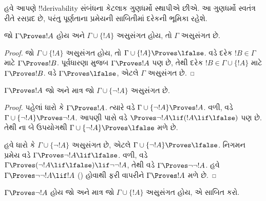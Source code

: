 \documentclass[../../../include/open-logic-section]{subfiles}
\begin{document}
      {}
      {}


હવે આપણે !!{derivability} સંબંધના કેટલાક ગુણધર્મો સ્થાપીએ છીએ. આ
ગુણધર્મો સ્વતંત્ર રીતે રસપ્રદ છે, પરંતુ પૂર્ણતાના પ્રમેયની સાબિતીમાં
દરેકની ભૂમિકા રહેશે.

\begin{prop}
  જો $\Gamma \Proves !A$ હોય અને $\Gamma \cup \{!A\}$ અસુસંગત હોય,
  તો $\Gamma$ અસુસંગત છે.
\end{prop}

\begin{proof}
  જો $\Gamma \cup \{!A\}$ અસુસંગત હોય, તો
  $\Gamma \cup \{!A\} \Proves \lfalse$. 
  વડે દરેક $!B \in \Gamma$ માટે $\Gamma \Proves !B$. પૂર્વધારણા
  મુજબ $\Gamma \Proves !A$ પણ છે, તેથી દરેક
  $!B \in \Gamma \cup \{!A\}$ માટે $\Gamma \Proves !B$.
   વડે $\Gamma \Proves \lfalse$, એટલે
  $\Gamma$ અસુસંગત છે.
\end{proof}

\begin{prop}
$\Gamma \Proves !A$ જો અને માત્ર જો $\Gamma \cup \{\lnot !A\}$
અસુસંગત છે.
\end{prop}

\begin{proof}
પહેલાં ધારો કે $\Gamma \Proves !A$. ત્યારે
 વડે
$\Gamma \cup \{\lnot !A\} \Proves !A$. વળી,
 વડે
$\Gamma \cup \{\lnot !A\} \Proves \lnot !A$. આપણી પાસે
 વડે
$\Proves \lnot !A \lif (!A \lif \lfalse)$ પણ છે. તેથી
ના બે ઉપયોગથી
$\Gamma \cup \{\lnot !A\} \Proves \lfalse$ મળે છે.

હવે ધારો કે $\Gamma \cup \{\lnot !A\}$ અસુસંગત છે, એટલે
$\Gamma \cup \{\lnot !A\} \Proves \lfalse$. નિગમન પ્રમેય વડે
$\Gamma \Proves \lnot !A \lif \lfalse$. વળી,
 વડે
$\Gamma \Proves (\lnot !A \lif \lfalse) \lif \lnot\lnot !A$, તેથી
 વડે $\Gamma \Proves \lnot\lnot !A$. હવે
$\Gamma \Proves \lnot\lnot !A \lif !A$ () હોવાથી
 ફરી વાપરીને $\Gamma \Proves !A$ મળે છે.
\end{proof}

\begin{prob}
$\Gamma \Proves \lnot !A$ હોય જો અને માત્ર જો $\Gamma \cup \{!A\}$
અસુસંગત હોય, એ સાબિત કરો.
\end{prob}
\end{document}
